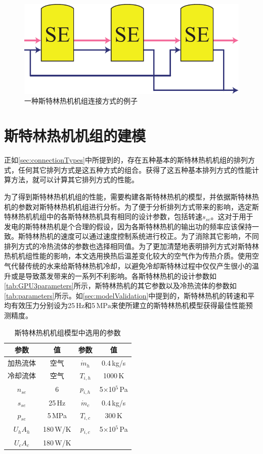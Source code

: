 \begin{figure}[htbp]
\centering
	\includegraphics[width = 0.3\columnwidth]{fig/SEA_eg}
	\caption{一种斯特林热机机组连接方式的例子}
	\label{fig:SEA_eg}
\end{figure}

\section{斯特林热机机组的建模}

正如\autoref{sec:connectionTypes}中所提到的，存在五种基本的斯特林热机机组的排列方式，任何其它排列方式是这五种方式的组合。获得了这五种基本排列方式的性能计算方法，就可以计算其它排列方式的性能。

为了得到斯特林热机机组的性能，需要构建各斯特林热机的模型，并依据斯特林热机的参数对斯特林热机机组进行分析。为了便于分析排列方式带来的影响，选定斯特林热机机组中的各斯特林热机具有相同的设计参数，包括转速$s_{se}$。这对于用于发电的斯特林热机是个合理的假设，因为各斯特林热机的输出功的频率应该保持一致。斯特林热机的速度可以通过速度控制系统进行校正\cite{Hooshang2016}。为了消除其它影响，不同排列方式的冷热流体的参数也选择相同值。为了更加清楚地表明排列方式对斯特林热机机组性能的影响，本文选用换热后温差变化较大的空气作为传热介质。使用空气代替传统的水来给斯特林热机冷却，以避免冷却斯特林过程中仅仅产生很小的温升或是导致蒸发带来的一系列不利影响。各斯特林热机的设计参数如\autoref{tab:GPU3parameters}所示，斯特林热机的其它参数以及冷热流体的参数如\autoref{tab:parameters}所示。如\autoref{sec:modelValidation}中提到的，斯特林热机的转速和平均有效压力分别设为25$\,\mathrm{Hz}$和5$\,\mathrm{MPa}$来使所建立的斯特林热机模型获得最佳性能预测精度。

\begin{table}[htbp]
	\caption{斯特林热机机组模型中选用的参数}
	\centering
	\begin{tabular}{cccc}
		\toprule
		参数		&	值	& 参数	&	值\\
		\midrule
		加热流体	&	空气		&	$\dot{m}_h$	&	0.4\,kg/s\\
		冷却流体	&	空气	&	$T_{i,h}$	&	1000\,K\\
		$n_{se}$	&	6	&	$p_{i,h}$	&	5$\times$10$^5$\,Pa\\
		$s_{se}$	&	25\,Hz	&	$\dot{m}_c$	&	0.4\,kg/s\\
		$p_{se}$		&	5\,MPa	&	$T_{i,c}$	&	300\,K\\
		$U_hA_h$	&	180\,W/K	&	$p_{i,c}$	&	5$\times$10$^5$\,Pa\\
		$U_cA_c$		&	180\,W/K	&&\\
		\bottomrule
	\end{tabular}
	\label{tab:parameters}
\end{table}

